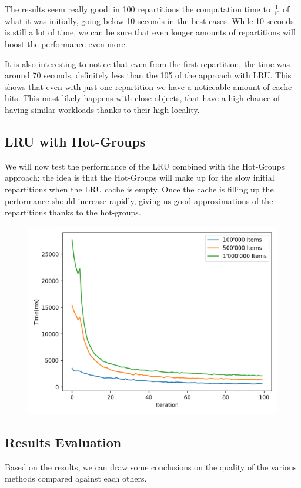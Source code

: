 The results seem really good: in 100 repartitions the computation time to $\frac{1}{10}$ of what it was initially, going below 10 seconds in the best cases. While 10 seconds is still a lot of time, we can be sure that even longer amounts of repartitions will boost the performance even more. 

It is also interesting to notice that even from the first repartition, the time was around 70 seconds, definitely less than the 105 of the approach with LRU. This shows that even with just one repartition we have a noticeable amount of cache-hits. This most likely happens with close objects, that have a high chance of having similar workloads thanks to their high locality.

\newpage
\subsection{LRU with Hot-Groups}\label{sec:lru-hot-groups}
We will now test the performance of the LRU combined with the Hot-Groups approach; the idea is that the Hot-Groups will make up for the slow initial repartitions when the LRU cache is empty. Once the cache is filling up the performance should increase rapidly, giving us good approximations of the repartitions thanks to the hot-groups. 

\begin{figure}[!htb]
  \centering
  \includegraphics[width=\textwidth,height=\textheight,keepaspectratio]{img/LRU_8_hot.png}
  \caption[caption]{ }
  \label{fig:LRU_8_hot}
\end{figure}

\subsection{Results Evaluation}\label{sec:results-evaluation}
Based on the results, we can draw some conclusions on the quality of the various methods compared against each others. 

